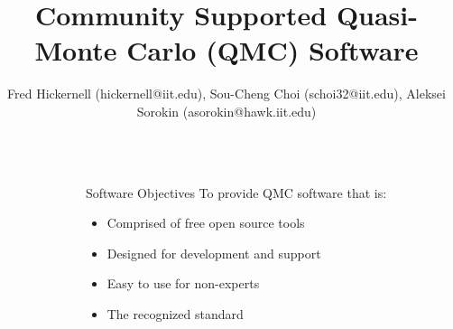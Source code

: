 \documentclass[final]{beamer}
\title{Community Supported Quasi-Monte Carlo (QMC) Software}
\author{Fred Hickernell (hickernell@iit.edu), Sou-Cheng Choi (schoi32@iit.edu), Aleksei Sorokin (asorokin@hawk.iit.edu)}
\institute{Illinois Instute of Technology}
\newlength{\sepwid}
\newlength{\onecolwid}
\newlength{\threecolwid}
\begin{document}
\setlength{\belowcaptionskip}{2ex}
\setlength\belowdisplayshortskip{2ex}
\begin{frame}[t]
\begin{columns}[t]

\begin{column}{\sepwid}\end{column}
\begin{column}{\threecolwid}
\begin{columns}[t,totalwidth=\threecolwid]  

\begin{column}{\onecolwid}\vspace{-1in}
\begin{block}{Software Objectives}
    To provide QMC software that is: 
    \begin{itemize}
        \item Comprised of free open source tools
        \item Designed for development and support 
        \item Easy to use for non-experts
        \item The recognized standard
    \end{itemize}
\end{block}


\end{column}
\end{columns}
\end{column}
\end{columns}
\end{frame}
\end{document}
